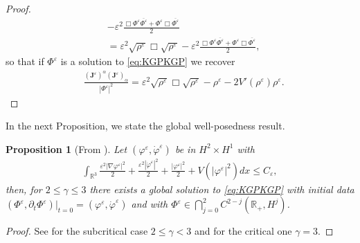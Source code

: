 \documentclass[a4paper, 15pt]{article}
\numberwithin{equation}{section}
\newtheorem{propal}[defi]{Proposition}
\begin{document}
\begin{proof}
\begin{align*}
          &-\varepsilon^2\frac{\Box\Phi^\varepsilon\overline{\Phi^\varepsilon}+\Phi^\varepsilon\Box\overline{\Phi^\varepsilon}}{2}\\
          &=\varepsilon^2\sqrt{\rho^\varepsilon}\Box\sqrt{\rho^\varepsilon}-\varepsilon^2\frac{\Box\Phi^\varepsilon\overline{\Phi^\varepsilon}+\Phi^\varepsilon\Box\overline{\Phi^\varepsilon}}{2},
    \end{align*}
    so that if $\Phi^\varepsilon$ is a solution to \eqref{eq:KGPKGP} we recover
     \begin{align*}
         &\frac{(\textbf{J}^\varepsilon)^\alpha(\textbf{J}^\varepsilon)_\alpha}{|\Phi^\varepsilon|^2}=\varepsilon^2\sqrt{\rho^\varepsilon}\Box\sqrt{\rho^\varepsilon}-\rho^\varepsilon-2V'(\rho^\varepsilon)\rho^\varepsilon.
    \end{align*}
\end{proof}
In the next Proposition, we state the global well-posedness result.\\
\begin{propal}[From \cite{Brenner1979,Wahl1981,zbMATH03875887,zbMATH04202876,zbMATH00011219,zbMATH00168350,zbMATH00703984,zbMATH00817689}]
\label{propal:solutglobalKGP}
    Let $(\varphi^\varepsilon,\dot{\varphi}^\varepsilon)$ be in $H^2\times H^1$ with
      \begin{align}
         \int_{\mathbb{R}^3}{\frac{\varepsilon^2|\nabla\varphi^\varepsilon|^2}{2}+\frac{\varepsilon^2|\dot{\varphi}^\varepsilon|^2}{2}+\frac{|\varphi^\varepsilon|^2}{2}+V(|\varphi^\varepsilon|^2)dx}\leq C_\varepsilon,
     \end{align}
    then, for $2\leq\gamma\leq3$ there exists a global solution to \eqref{eq:KGPKGP} with initial data $(\Phi^\varepsilon,\partial_t\Phi^\varepsilon)|_{t=0}=(\varphi^\varepsilon,\dot{\varphi}^\varepsilon)$ and with $\Phi^\varepsilon\in\bigcap^{2}_{j=0}C^{2-j}(\mathbb{R}_+,H^{j})$.\\
\end{propal}
\begin{proof}
     See \cite{Brenner1979,Wahl1981,zbMATH03875887} for the subcritical case $2\leq\gamma<3$ and \cite{zbMATH04202876,zbMATH00011219,zbMATH00168350,zbMATH00703984,zbMATH00817689} for the critical one $\gamma=3$.
\end{proof}
\end{document}
